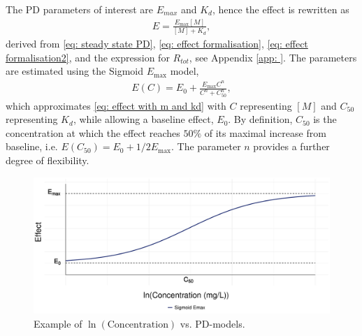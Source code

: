 The PD parameters of interest are $E_{max}$ and $K_d$, hence the effect is rewritten as 
\begin{align}
    E = \frac{E_{\text{max}}[M]}{[M] + K_d}, \label{eq: effect with m and kd}
\end{align}
derived from \eqref{eq: steady state PD}, \eqref{eq: effect formalisation}, \eqref{eq: effect formalisation2}, and the expression for $R_{tot}$, see Appendix \ref{app: }.
The parameters are estimated using the Sigmoid $E_{\text{max}}$ model,
\begin{align}\label{eq: sigmoid emax}
    E(C) = E_0 + \frac{E_{\text{max}}C^n}{C^n+C_{50}^n}, 
\end{align}
which approximates \eqref{eq: effect with m and kd} with $C$ representing $[M]$ and $C_{50}$ representing $K_d$, while allowing a baseline effect, $E_0$. By definition, $C_{50}$ is the concentration at which the effect reaches $50\%$ of its maximal increase from baseline, i.e. $E(C_{50}) = E_0 + 1/2 E_{\text{max}}$. The parameter $n$ provides a further degree of flexibility.

\begin{figure}[H]
    \centering
    \includegraphics[width=0.9\linewidth]{fig/img/PD/ModelPlots.pdf}
    \caption{Example of $\ln(\text{Concentration})$ vs. PD-models.}
    \label{fig: Different PD-models}
\end{figure}

